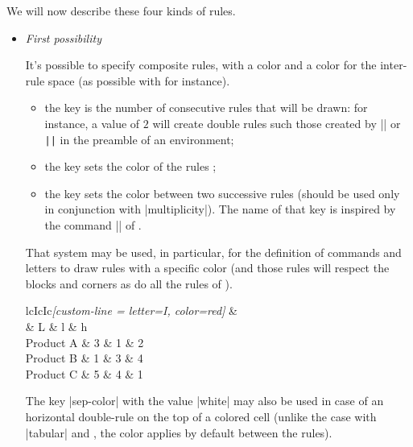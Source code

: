 \documentclass[dvipsnames]{article}
\begin{document}
\bigskip
We will now describe these four kinds of rules.
\begin{itemize}[beginpenalty=10000]
\item \emph{First possibility}

\nobreak
It's possible to specify composite rules, with a color and a color for the
inter-rule space (as possible with  for instance).

\begin{itemize}
\item the key  is the number of consecutive rules that
will be drawn: for instance, a value of $2$ will create double rules such those
created by |\hline\hline| or \verb+||+ in the preamble of an environment;

\item the key  sets the color of the rules ;

\item the key  sets the color between two successive rules
(should be used only in conjunction with |multiplicity|). The name of that key
is inspired by the command |\doublerulesepcolor| of .
\end{itemize}

\medskip
That system may be used, in particular, for the definition of commands and
letters to draw rules with a specific color (and those rules will respect the
blocks and corners as do all the rules of ). 

\medskip
\begin{Code}
\begin{NiceTabular}{lcIcIc}\emph{[custom-line = {letter=I, color=red}]}
\Hline
            &  \\
            & L & l & h \\
\Hline
  Product A & 3 & 1 & 2 \\
  Product B & 1 & 3 & 4 \\
  Product C & 5 & 4 & 1 \\
\Hline
\end{NiceTabular}
\end{Code}



\bigskip
The key |sep-color| with the value |white| may also be used in case of an
horizontal double-rule on the top of a colored cell (unlike the case with |{tabular}|
and , the color applies by default between the rules).



\end{itemize}
\end{document}
